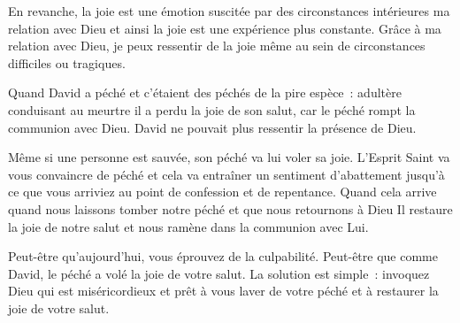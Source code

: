 En revanche, la joie est une émotion suscitée par des circonstances
 intérieures \ocadr ma relation avec Dieu \fcadr{} et ainsi la joie
 est une expérience plus constante.
 Grâce à ma relation avec Dieu, je peux ressentir de la joie
 même au sein de circonstances difficiles ou tragiques. 

Quand David a péché \ocadr et c'étaient des péchés de la pire espèce~:
 adultère conduisant au meurtre \fcadr{} il a perdu la joie de son salut,
 car le péché rompt la communion avec Dieu.
 David ne pouvait plus ressentir la présence de Dieu. 


Même si une personne est sauvée, son péché va lui voler sa joie.
 L'Esprit Saint va vous convaincre de péché et cela va entraîner
 un sentiment d'abattement jusqu'à ce que vous arriviez au point de confession
 et de repentance.
 Quand cela arrive \ocadr quand nous laissons tomber notre péché
 et que nous retournons à Dieu \fcadr Il restaure la joie de notre salut
 et nous ramène dans la communion avec Lui. 

Peut-être qu'aujourd'hui, vous éprouvez de la culpabilité.
 Peut-être que comme David, le péché a volé la joie de votre salut.
 La solution est simple~: invoquez Dieu qui est miséricordieux
 et prêt à vous laver de votre péché et à restaurer la joie de votre salut.

\dvrule



